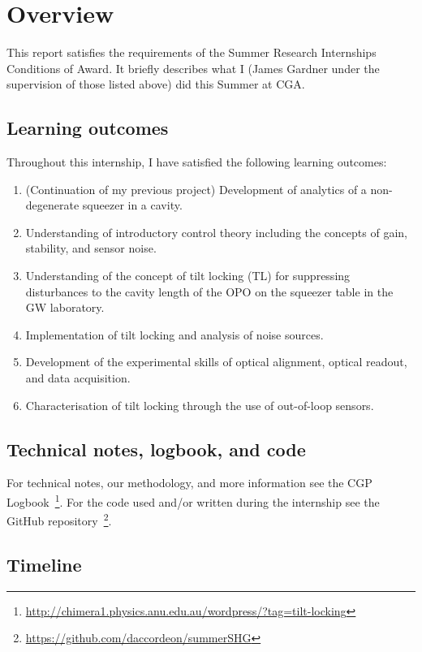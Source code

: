 \documentclass[aps,pra,superscriptaddress,reprint,nofootinbib]{revtex4-1}
\begin{document}
\section{Overview}

This report satisfies the requirements of the Summer Research Internships Conditions of Award. It briefly describes what I (James Gardner under the supervision of those listed above) did this Summer at CGA.

\subsection{Learning outcomes}

Throughout this internship, I have satisfied the following learning outcomes:
\begin{enumerate}
\item (Continuation of my previous project) Development of analytics of a non-degenerate squeezer in a cavity.
\item Understanding of introductory control theory including the concepts of gain, stability, and sensor noise.
\item Understanding of the concept of tilt locking (TL) for suppressing disturbances to the cavity length of the OPO on the squeezer table in the GW laboratory.
\item Implementation of tilt locking and analysis of noise sources.
\item Development of the experimental skills of optical alignment, optical readout, and data acquisition.
\item Characterisation of tilt locking through the use of out-of-loop sensors.
\end{enumerate}

\subsection{Technical notes, logbook, and code}

For technical notes, our methodology, and more information see the CGP Logbook~\footnote{\url{http://chimera1.physics.anu.edu.au/wordpress/?tag=tilt-locking}}. For the code used and/or written during the internship see the GitHub repository~\footnote{\url{https://github.com/daccordeon/summerSHG}}.

\subsection{Timeline}
\end{document}

